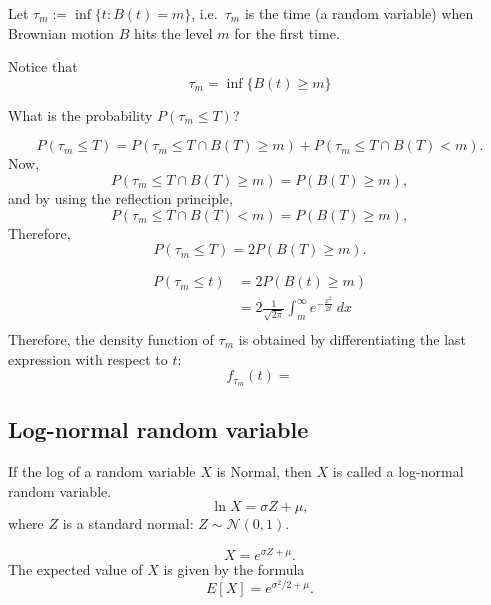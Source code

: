 \documentclass{amsart}
\theoremstyle{plain}
\numberwithin{equation}{section}
\begin{document}
Let $\tau_m := \inf \{ t: B(t) = m \}$, i.e.\
$\tau_m$ is the time (a random variable)
when Brownian motion $B$ hits the 
level $m$ for the first time.

Notice that 
\begin{equation}
\tau_m = \inf \{ B(t) \geq m\}
\end{equation}

What is the probability $P(\tau_m \leq T)$?

\begin{equation*}
P(\tau_m \leq T) = 
P(\tau_m \leq T \cap B(T) \geq m ) + 
P(\tau_m \leq T \cap B(T) < m ).
\end{equation*}
Now,
\begin{equation}
P(\tau_m \leq T \cap B(T) \geq m ) = P( B(T) \geq m ), 
\end{equation}
and by using the reflection principle,
\begin{equation}
P(\tau_m \leq T \cap B(T) < m ) = P( B(T) \geq m ), 
\end{equation}
Therefore,
\begin{equation}
P(\tau_m \leq T) = 2 P(B(T) \geq m ).
\end{equation}


\begin{align}
P(\tau_m \leq t) &= 2 P(B(t) \geq m )\\
                 &= 2 \frac{1}{\sqrt{2\pi}} \int_{m}^{\infty} e^{-\frac{x^2}{2t}} \: dx\\								
\end{align}
Therefore, the density function of
$\tau_m$ is obtained by differentiating the last expression 
with respect to $t$:
\begin{equation}
f_{\tau_m} (t) = 
\end{equation}

\subsection*{Log-normal random variable}
If the log of a random variable $X$ is 
Normal, then $X$ is called a log-normal
random variable.
\begin{equation}
\ln X = \sigma Z + \mu,
\end{equation}
where $Z$ is a
standard normal: $Z \sim \mathcal{N}(0, 1)$.

\begin{equation}
X = e^{\sigma Z + \mu}.
\end{equation}
The expected value of $X$ is 
given by the formula
\begin{equation}
E[X] = e^{\sigma^2/2 + \mu}.
\end{equation}
\end{document}
